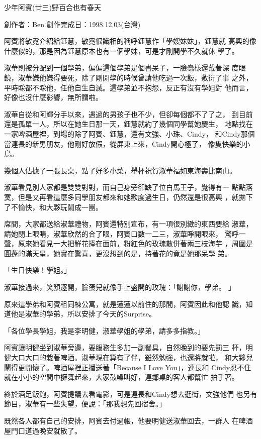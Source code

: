 



少年阿賓(廿三)野百合也有春天

創作者：Ben
創作完成日：1998.12.03(台灣)


阿賓將敏霓介紹給鈺慧，敏霓很識相的稱呼鈺慧作「學嫂妹妹」，鈺慧就
高興的像什麼似的，那是因為鈺慧原本也有一個學妹，可是才剛開學不久就休
學了。

淑華則被分配到一個學弟，偏偏這個學弟是個書呆子，一臉蠢樣還戴著深
度眼鏡，淑華嫌他嫌得要死，除了剛開學的時候曾請他吃過一次飯，敷衍了事
之外，平時睬都不睬他，任他自生自滅。這學弟並不抱怨，反正有沒有學姐對
他而言，好像也沒什麼影響，無所謂啦。

淑華自從和阿輝分手以來，遇過的男孩子也不少，但卻每個都不了了之，
到目前還是孤單一人，所以在她生日那一天，鈺慧就約了幾個同學幫她慶生，
地點找在一家啤酒屋裡，到場的除了阿賓、鈺慧，還有文強、小珠、Cindy，
和Cindy那個當連長的新男朋友，他剛好放假，從屏東上來，Cindy開心極了，
像隻快樂的小鳥。

幾個人佔據了一張長桌，點了好多小菜，舉杯祝賀淑華福如東海壽比南山。

淑華看見別人家都是雙雙對對，而自己身旁卻缺了位白馬王子，覺得有一
點點落寞，但是又再看這麼多同學朋友都來和她歡度過生日，仍然還是很高興
，就拋下了不愉快，和大夥玩鬧成一團。

席間，大家都送給淑華禮物，阿賓還特別宣布，有一項很別緻的東西要給
淑華，請她閉上眼睛，淑華欣然的合了眼，阿賓口數一二三，淑華睜開眼來，
驚呼一聲，原來她看見一大把鮮花捧在面前，粉紅色的玫瑰散併著兩三枝海芋
，周圍是圓蓬的滿天星，她實在驚喜，更沒想到的是，持著花的竟是她那呆學
弟。

「生日快樂！學姐。」

淑華接過來，笑顏逐開，臉蛋兒就像手上盛開的玫瑰：「謝謝你，學弟。
」

原來這學弟和阿賓租同棟公寓，就是蓮蓮以前住的那間，阿賓因此和他認
識，知道他是淑華的學弟，所以安排了今天的Surprise。

「各位學長學姐，我是李明健，淑華學姐的學弟，請多多指教。」

阿賓讓明健坐到淑華旁邊，要服務生多加一副餐具，自然晚到的要先罰三
杯，明健大口大口的栽著啤酒。淑華現在算有了伴，雖然勉強，也還將就啦，
和大夥兒鬧得更開懷了。啤酒屋裡正播送著「Because I Love You」，連長和
Cindy忍不住就在小小的空間中擁舞起來，大家鼓噪叫好，連鄰桌的客人都幫忙
拍手著。

終於酒足飯飽，阿賓提議去看電影，可是連長和Cindy想去逛街，文強他們
也另有節目，淑華有一些失望，便說：「那我想先回宿舍。」

既然各人都有自己的安排，阿賓去付過帳，他要明健送淑華回去，一群人
在啤酒屋門口道過晚安就散了。


